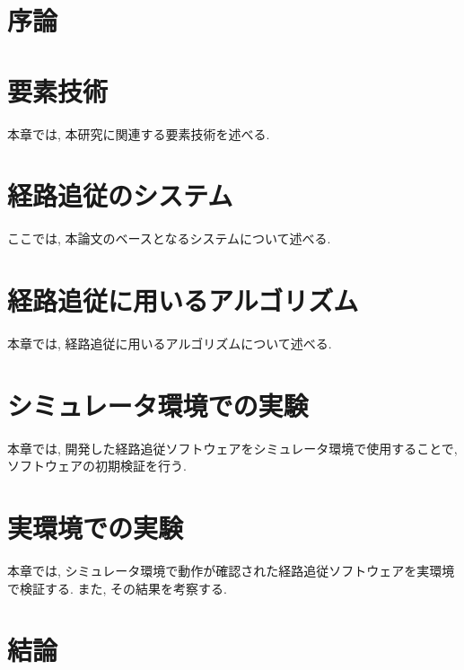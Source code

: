 \chapter{序論}
\label{chap:introduction}
%
%
%

\chapter{要素技術}
本章では, 本研究に関連する要素技術を述べる.

\chapter{経路追従のシステム}
ここでは, 本論文のベースとなるシステムについて述べる.

\chapter{経路追従に用いるアルゴリズム}
本章では, 経路追従に用いるアルゴリズムについて述べる.

\chapter{シミュレータ環境での実験}
本章では, 開発した経路追従ソフトウェアをシミュレータ環境で使用することで, ソフトウェアの初期検証を行う.

\chapter{実環境での実験}
本章では, シミュレータ環境で動作が確認された経路追従ソフトウェアを実環境で検証する.
また, その結果を考察する.

\chapter{結論}
